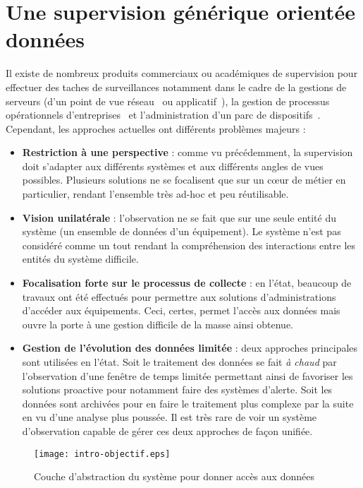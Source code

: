 \section{Une supervision générique orientée données}\label{sec:intro:objectif}
Il existe de nombreux produits commerciaux ou académiques de supervision pour effectuer des taches de surveillances notamment dans le cadre de la gestions de serveurs (d'un point de vue réseau~\cite{gestionequipreseau} ou applicatif~\cite{supervisionapache}), la gestion de processus opérationnels d'entreprises~\cite{google:businessprocesssupervision} et l'administration d'un parc de dispositifs~\cite{snmp:thesemehdi}. Cependant, les approches actuelles ont différents problèmes majeurs :
\begin{itemize}
    \item \textbf{Restriction à une perspective} : comme vu précédemment, la supervision doit s'adapter aux différents systèmes et aux différents angles de vues possibles. Plusieurs solutions ne se focalisent que sur un cœur de métier en particulier, rendant l'ensemble très ad-hoc et peu réutilisable.
    \item \textbf{Vision unilatérale} : l'observation ne se fait que sur une seule entité du système (un ensemble de données d'un équipement). Le système n'est pas considéré comme un tout rendant la compréhension des interactions entre les entités du système difficile.
    \item \textbf{Focalisation forte sur le processus de collecte} : en l'état, beaucoup de travaux ont été effectués pour permettre aux solutions d'administrations d'accéder aux équipements. Ceci, certes, permet l'accès aux données mais ouvre la porte à une gestion difficile de la masse ainsi obtenue.
    \item \textbf{Gestion de l'évolution des données limitée} : deux approches principales sont utilisées en l'état. Soit le traitement des données se fait \textit{à chaud} par l'observation d'une fenêtre de temps limitée permettant ainsi de favoriser les solutions proactive pour notamment faire des systèmes d'alerte. Soit les données sont archivées pour en faire le traitement plus complexe par la suite en vu d'une analyse plus poussée. Il est très rare de voir un système d'observation capable de gérer ces deux approches de façon unifiée. 
\end{itemize}

\begin{figure}
\centering
\texttt{[image: intro-objectif.eps]}
\caption{Couche d'abstraction du système pour donner accès aux données}\label{fig:intro:objectif:abstraction}
\end{figure}

